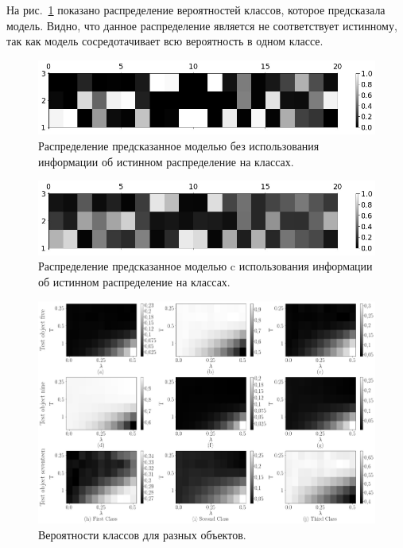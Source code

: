 На рис.~\ref{fg:ex:synt:distr:without} показано распределение вероятностей классов, которое предсказала модель. Видно, что данное распределение является не соответствует истинному, так как модель сосредотачивает всю вероятность в одном классе.

\begin{figure}[h!t]\center
\includegraphics[width=1\textwidth]{results/privlearn/syn_without_teacher_distr}
\caption{Распределение предсказанное моделью без использования информации об истинном распределение на классах.}
\label{fg:ex:synt:distr:without}
\end{figure}

\begin{figure}[h!t]\center
\includegraphics[width=1\textwidth]{results/privlearn/syn_with_teacher_distr}
\caption{Распределение предсказанное моделью c использования информации об истинном распределение на классах.}
\label{fg:ex:synt:distr:with}
\end{figure}

\begin{figure}[h!t]\center
\includegraphics[width=1\textwidth]{results/privlearn/syn_T_lambda}
\caption{Вероятности классов для разных объектов.}
\label{fg:ex:synt:distr:lambda_T}
\end{figure}

